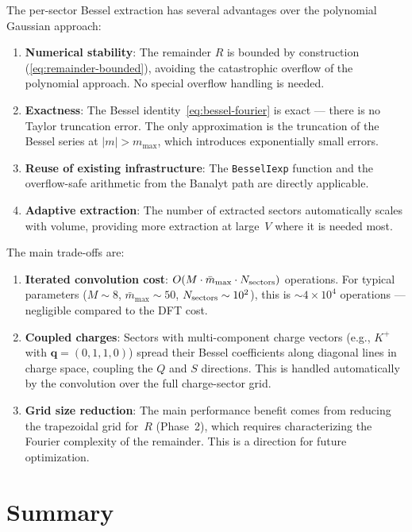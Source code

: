 \documentclass[11pt,a4paper]{article}
\newcommand{\bq}{\bm{q}}
\begin{document}
The per-sector Bessel extraction has several advantages over the polynomial Gaussian approach:
\begin{enumerate}
  \item \textbf{Numerical stability}: The remainder $R$ is bounded by construction (\cref{eq:remainder-bounded}), avoiding the catastrophic overflow of the polynomial approach.
  No special overflow handling is needed.
  \item \textbf{Exactness}: The Bessel identity~\cref{eq:bessel-fourier} is exact --- there is no Taylor truncation error.
  The only approximation is the truncation of the Bessel series at $|m| > m_{\max}$, which introduces exponentially small errors.
  \item \textbf{Reuse of existing infrastructure}: The \texttt{BesselIexp} function and the overflow-safe arithmetic from the Banalyt path are directly applicable.
  \item \textbf{Adaptive extraction}: The number of extracted sectors automatically scales with volume, providing more extraction at large~$V$ where it is needed most.
\end{enumerate}

The main trade-offs are:
\begin{enumerate}
  \item \textbf{Iterated convolution cost}: $O(M \cdot \bar{m}_{\max} \cdot N_{\rm sectors})$ operations.
  For typical parameters ($M \sim 8$, $\bar{m}_{\max} \sim 50$, $N_{\rm sectors} \sim 10^2$), this is $\sim 4 \times 10^4$ operations --- negligible compared to the DFT cost.
  \item \textbf{Coupled charges}: Sectors with multi-component charge vectors (e.g., $K^+$ with $\bq = (0, 1, 1, 0)$) spread their Bessel coefficients along diagonal lines in charge space, coupling the $Q$ and $S$ directions.
  This is handled automatically by the convolution over the full charge-sector grid.
  \item \textbf{Grid size reduction}: The main performance benefit comes from reducing the trapezoidal grid for~$R$ (Phase~2), which requires characterizing the Fourier complexity of the remainder.
  This is a direction for future optimization.
\end{enumerate}


\section{Summary}
\label{sec:summary}
\end{document}
